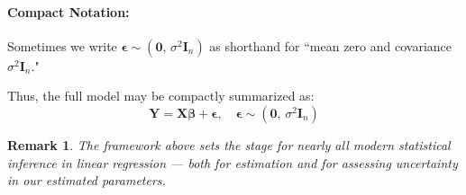 \documentclass[12pt]{article}
\newtheorem{remark}[definition]{Remark}
\begin{document}
\paragraph{Compact Notation:}
Sometimes we write $\boldsymbol{\epsilon} \sim (\mathbf{0},\, \sigma^2 \boldsymbol{I}_n)$ as shorthand for ``mean zero and covariance $\sigma^2 \boldsymbol{I}_n.$"

Thus, the full model may be compactly summarized as:
\[
    \boxed{
        \boldsymbol{Y} = \boldsymbol{X} \boldsymbol{\beta} + \boldsymbol{\epsilon},\quad
        \boldsymbol{\epsilon} \sim (\mathbf{0},\, \sigma^2 \boldsymbol{I}_n)
    }
\]

\begin{remark}
The framework above sets the stage for nearly all modern statistical inference in linear regression --- both for estimation and for assessing uncertainty in our estimated parameters.
\end{remark}

\end{document}
